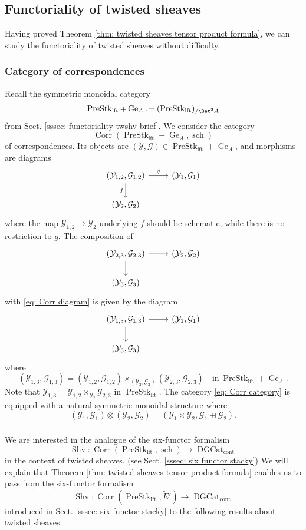 \documentclass[10pt]{amsart}
\newcommand{\sssec}{\subsubsection}
\theoremstyle{remark}
\newcommand{\te}{\text}
\newcommand{\wt}{\widetilde}
\newcommand{\on}{\operatorname}
\newcommand{\cG}{\mathcal{G}}
\newcommand{\cY}{\mathcal{Y}}
\newcommand{\DGcat}{\on{DGCat}_{\on{cont}}}
\newcommand{\Shv}{\on{Shv}}
\newcommand{\PreStklft}{\on{PreStk}_{\on{lft}}}
\newcommand{\Corr}{\on{Corr}}
\begin{document}
\subsection{Functoriality of twisted sheaves}\label{ssec: functoriality of twisted sheaves}
Having proved Theorem \ref{thm: twisted sheaves tensor product formula}, we can study the functoriality of twisted sheaves without difficulty. 

\sssec{Category of correspondences}
Recall the symmetric monoidal category
\[\PreStklft+\on{Ge}_A := (\PreStklft)_{/\Bet^2 A}\]
from Sect. \ref{sssec: functoriality twshv brief}. We consider the category
\begin{equation}\label{eq: Corr category}
    \on{Corr}\left(\PreStklft+\on{Ge}_A, \on{sch}\right)
\end{equation}
of correspondences. Its objects are $(\cY,\cG)\in\PreStklft+\on{Ge}_A$, and morphisms are diagrams
\begin{equation}\label{eq: Corr diagram}
    \begin{tikzcd}
	{(\cY_{1,2},\cG_{1,2})} & {(\cY_1,\cG_1)} \\
	{(\cY_2,\cG_2)}
	\arrow["g", from=1-1, to=1-2]
	\arrow["f"', from=1-1, to=2-1]
\end{tikzcd}
\end{equation}
where the map $\cY_{1,2}\rightarrow \cY_2$ underlying $f$ should be schematic, while there is no restriction to $g$. The composition of \[\begin{tikzcd}
	{(\cY_{2,3},\cG_{2,3})} & {(\cY_2,\cG_2)} \\
	{(\cY_3,\cG_3)}
	\arrow[ from=1-1, to=1-2]
	\arrow[ from=1-1, to=2-1]
\end{tikzcd}\]
with \eqref{eq: Corr diagram} is given by the diagram
\[\begin{tikzcd}
	{(\cY_{1,3},\cG_{1,3})} & {(\cY_1,\cG_1)} \\
	{(\cY_3,\cG_3)}
	\arrow[from=1-1, to=1-2]
	\arrow[from=1-1, to=2-1]
\end{tikzcd}\]
where 
\[(\cY_{1,3},\cG_{1,3})=(\cY_{1,2},\cG_{1,2})\times_{(\cY_2,\cG_2)}(\cY_{2,3},\cG_{2,3}) \quad \te{in} \ \PreStklft+\on{Ge}_A.\]
Note that
$\cY_{1,3}=\cY_{1,2}\times_{\cY_2}\cY_{2,3}$ in $\PreStklft$. The category \eqref{eq: Corr category} is equipped with a natural symmetric monoidal structure where
\[(\cY_1,\cG_1)\otimes (\cY_2,\cG_2) = (\cY_1\times\cY_2, \cG_1\boxplus \cG_2).\]

\sssec{}
We are interested in the analogue of the six-functor formalism
\begin{equation}\label{eq: shv Corr sch}
    \Shv:\Corr(\PreStklft,\on{sch})\rightarrow\DGcat
\end{equation}
in the context of twisted sheaves. (see Sect. \ref{sssec: six functor stacky}) We will explain that Theorem \ref{thm: twisted sheaves tensor product formula} enables us to pass from the six-functor formalism
\begin{equation}\label{eq: six functor stacky}
    \Shv: \Corr(\PreStklft,\wt{E}')\rightarrow\DGcat
\end{equation}
introduced in Sect. \ref{sssec: six functor stacky} to the following results about twisted sheaves:
\end{document}
